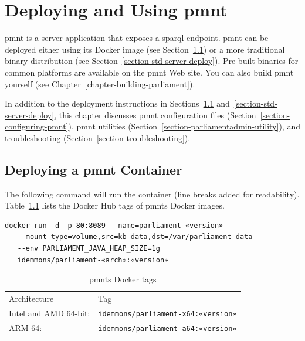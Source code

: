 
\chapter{Deploying and Using \acl{pmnt}}
\label{chapter-deploying-and-using}

\ac{pmnt} is a server application that exposes a \ac{sparql} endpoint.  \ac{pmnt} can be deployed either using its Docker image (see Section~\ref{section-std-container-deploy}) or a more traditional binary distribution (see Section~\ref{section-std-server-deploy}). Pre-built binaries for common platforms are available on the \ac{pmnt} Web site.  You can also build \ac{pmnt} yourself (see Chapter~\ref{chapter-building-parliament}).

In addition to the deployment instructions in Sections~\ref{section-std-container-deploy} and~\ref{section-std-server-deploy}, this chapter discusses \ac{pmnt} configuration files (Section~\ref{section-configuring-pmnt}), \ac{pmnt} utilities (Section~\ref{section-parliamentadmin-utility}), and troubleshooting (Section~\ref{section-troubleshooting}).

\section{Deploying a \ac{pmnt} Container}
\label{section-std-container-deploy}

The following command will run the container (line breaks added for readability). Table~\ref{tbl:DockerTags} lists the Docker Hub tags of \acp{pmnt} Docker images.
{\small
\begin{verbatim}
docker run -d -p 80:8089 --name=parliament-«version»
   --mount type=volume,src=kb-data,dst=/var/parliament-data
   --env PARLIAMENT_JAVA_HEAP_SIZE=1g
   idemmons/parliament-«arch»:«version»
\end{verbatim}
}

\begin{table}[htbp]
	\centering
	\begin{tabular}{ll}
		\toprule
		Architecture & Tag\\
		\headingrule
		Intel and AMD 64-bit: & \texttt{idemmons/parliament-x64:«version»}\\
		ARM-64: & \texttt{idemmons/parliament-a64:«version»}\\
		\bottomrule
	\end{tabular}
	\caption{\acp*{pmnt} Docker tags}
	\label{tbl:DockerTags}
\end{table}

